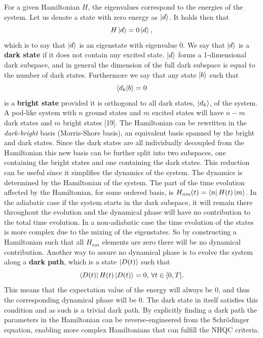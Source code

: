 For a given Hamiltonian $H$, the eigenvalues correspond to the energies of the system. Let us denote a state with zero energy as $\ket{d}$. It holds then that
\begin{equation}
H\ket{d} = 0\ket{d},
\end{equation}
which is to say that $\ket{d}$ is an eigenstate with eigenvalue $0$. We say that $\ket{d}$ is a \textbf{dark state} if it does not contain any excited state. $\ket{d}$ forms a 1-dimensional dark subspace, and in general the dimension of the full dark subspace is equal to the number of dark states. Furthermore we say that any state $\ket{b}$ such that 
\begin{equation}
\bra{d_k}\ket{b} = 0
\end{equation}
is a \textbf{bright state} provided it is orthogonal to all dark states, $\ket{d_k}$, of the system. A pod-like system with $n$ ground states and $m$ excited states will have $n-m$ dark states and $m$ bright states [19].
The Hamiltonian can be rewritten in the \textit{dark-bright} basis (Morris-Shore basis), an equivalent basis spanned by the bright and dark states. Since the dark states are all individually decoupled from the Hamiltonian this new basis can be further split into two subspaces, one containing the bright states and one containing the dark states. This reduction can be useful since it simplifies the dynamics of the system. 
The dynamics is determined by the Hamiltonian of the system. The part of the time evolution affected by the Hamiltonian, for some ordered basis, is $H_{nm}(t) = \bra{n}H(t)\ket{m}$. In the adiabatic case if the system starts in the dark subspace, it will remain there throughout the evolution and the dynamical phase will have no contribution to the total time evolution. In a non-adiabatic case the time evolution of the states is more complex due to the mixing of the eigenstates. So by constructing a Hamiltonian such that all $H_{nm}$ elements are zero there will be no dynamical contribution. Another way to assure no dynamical phase is to evolve the system along a \textbf{dark path}, which is a state $\ket{D(t)}$ such that 
\begin{equation}
\bra{D(t)}H(t)\ket{D(t)} = 0, \, \forall t\in[0,T].
\end{equation}
This means that the expectation value of the energy will always be $0$, and thus the corresponding dynamical phase will be $0$. The dark state in itself satisfies this condition and as such is a trivial dark path. By explicitly finding a dark path the parameters in the Hamiltonian can be reverse-engineered from the Schrödinger equation, enabling more complex Hamiltonians that can fulfill the NHQC criteria.


